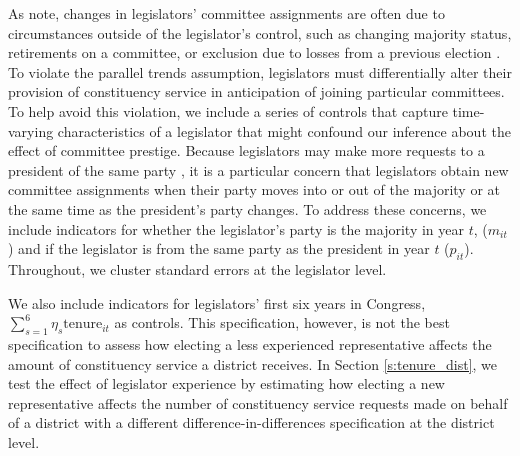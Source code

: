 \documentclass[12pt]{article}
\begin{document}
As \cite{BerryFowler2016} note, changes in legislators' committee assignments are often due to circumstances outside of the legislator's control, such as changing majority status, retirements on a committee, or exclusion due to losses from a previous election \citep{GrimmerPowell2013}. To violate the parallel trends assumption,  legislators must differentially alter their provision of constituency service in anticipation of joining particular committees. To help avoid this violation, we include a series of controls that capture time-varying characteristics of a legislator that might confound our inference about the effect of committee prestige. Because legislators may make more requests to a president of the same party \citep{BerryBurdenHowell09}, it is a particular concern that legislators obtain new committee assignments when their party moves into or out of the majority or at the same time as the president's party changes. To address these concerns, we include indicators for whether the legislator's party is the majority in year $t$, ($m_{it}$) and if the legislator is from the same party as the president in year $t$ ($p_{it}$). Throughout, we cluster standard errors at the legislator level.

We also include indicators for legislators' first six years in Congress, $ \sum_{s = 1}^{6} \eta_{s} \text{tenure}_{it}$ as controls.
This specification, however, is not the best specification to assess how electing a less experienced representative affects the amount of constituency service a district receives. In Section \ref{s:tenure_dist}, we test the effect of legislator experience by estimating how electing a new representative affects the number of constituency service requests made on behalf of a district with a different difference-in-differences specification at the district level.   

\end{document}
